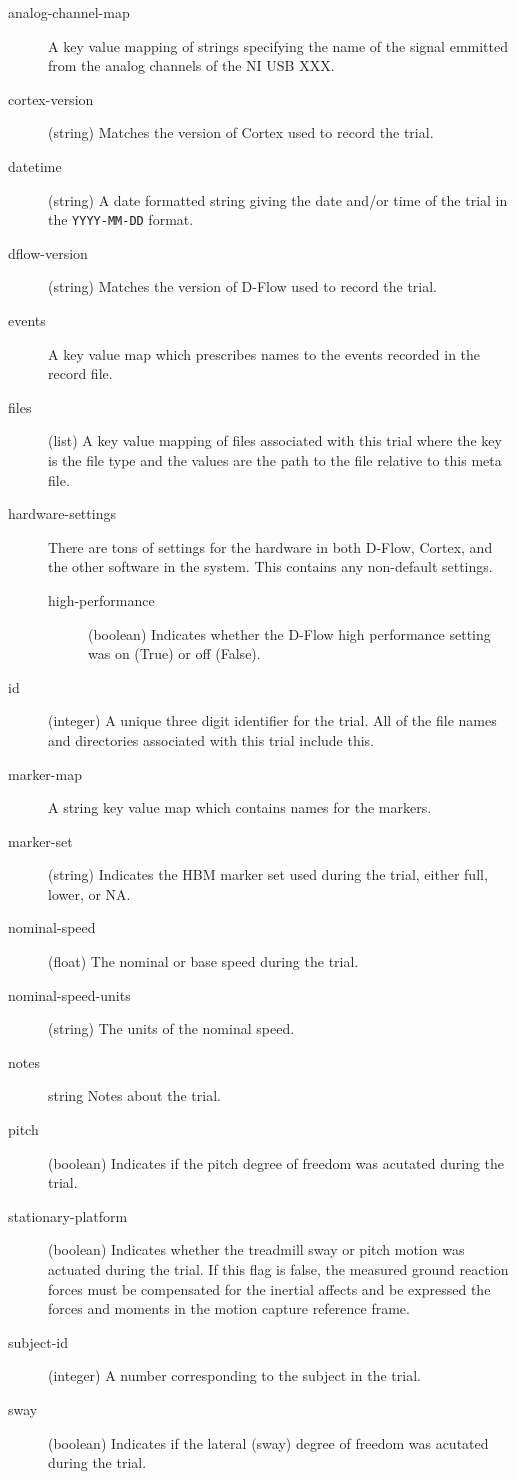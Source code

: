 \documentclass{article}
\begin{document}
\begin{description}
  \item[analog-channel-map] A key value mapping of strings specifying the name
    of the signal emmitted from the analog channels of the NI USB XXX.
  \item[cortex-version] (string) Matches the version of Cortex used to record
    the trial.
  \item[datetime] (string) A date formatted string giving the date and/or time
    of the trial in the \verb|YYYY-MM-DD| format.
  \item[dflow-version] (string) Matches the version of D-Flow used to record
    the trial.
  \item[events] A key value map which prescribes names to the events recorded
    in the record file.
  \item[files] (list) A key value mapping of files associated with this trial
    where the key is the file type and the values are the path to the file
    relative to this meta file.
  \item[hardware-settings] There are tons of settings for the hardware in both
    D-Flow, Cortex, and the other software in the system. This contains any
    non-default settings.
    \begin{description}
      \item[high-performance] (boolean) Indicates whether the D-Flow high
        performance setting was on (True) or off (False).
    \end{description}
  \item[id] (integer) A unique three digit identifier for the trial. All of the
    file names and directories associated with this trial include this.
  \item[marker-map] A string key value map which contains names for the
    markers.
  \item[marker-set] (string) Indicates the HBM \cite{Bogert2013} marker
    set used during the trial, either full, lower, or NA.
  \item[nominal-speed] (float) The nominal or base speed during the trial.
  \item[nominal-speed-units] (string) The units of the nominal speed.
  \item[notes] {string} Notes about the trial.
  \item[pitch] (boolean) Indicates if the pitch degree of freedom was acutated
    during the trial.
  \item[stationary-platform] (boolean) Indicates whether the treadmill
      sway or pitch motion was actuated during the trial. If this flag is
      false, the measured ground reaction forces must be compensated for the
      inertial affects and be expressed the forces and moments in the motion
      capture reference frame.
  \item[subject-id] (integer) A number corresponding to the subject in the
    trial.
  \item[sway] (boolean) Indicates if the lateral (sway) degree of freedom was
    acutated during the trial.
\end{description}
\end{document}
